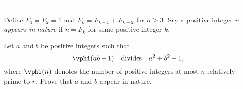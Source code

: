 
---

Define $F_1=F_2=1$ and $F_k=F_{k-1}+F_{k-2}$ for $n\ge3$.
Say a positive integer $n$ \emph{appears in nature} if $n=F_k$ for some positive integer $k$.

Let $a$ and $b$ be positive integers such that
\[
    \vphi(ab+1)\quad\text{divides}\quad a^2+b^2+1,
\]
where $\vphi(n)$ denotes the number of positive integers at most $n$ relatively prime to $n$.
Prove that $a$ and $b$ appear in nature.

